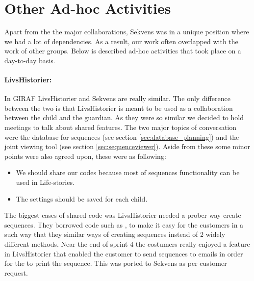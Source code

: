 \section{Other Ad-hoc Activities}\label{sec:adhoc}
Apart from the the major collaborations, Sekvens was in a unique position where we had a lot of dependencies. As a result, our work often overlapped with the work of other groups. Below is described ad-hoc activities that took place on a day-to-day basis.

\paragraph{LivsHistorier:} 
In GIRAF LivsHistorier and Sekvens are really similar. The only difference between the two is that LivsHistorier is meant to be used as a collaboration between the child and the guardian. As they were so similar we decided to hold meetings to talk about shared features. The two major topics of conversation were the database for sequences (see section \ref{sec:database_planning}) and the joint viewing tool (see section \ref{sec:sequenceviewer}). Aside from these some minor points were also agreed upon, these were as following:

\begin{itemize}
\item We should share our codes because most of sequences functionality can be used in Life-stories.
\item The settings should be saved for each child.
\end{itemize}

The biggest cases of shared code was LivsHistorier needed a prober way create sequences. They borrowed code such as , 
to make it easy for the customers in a such way that they similar ways of creating sequences instead of 2 widely different methods. Near the end of sprint 4 the costumers really enjoyed a feature in LivsHistorier that enabled the customer to send sequences to emails in order for the to print the sequence. This was ported to Sekvens as per customer request.

